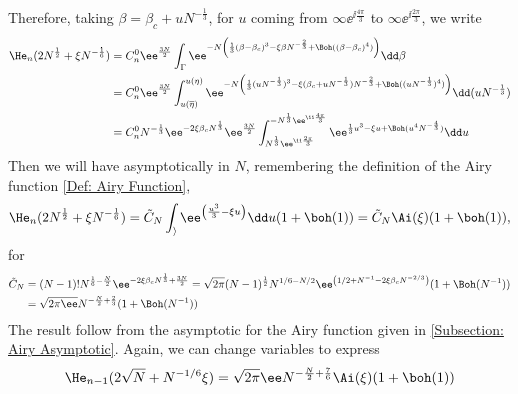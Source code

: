{\begin{figure}
	\label{Figure: Change of local variables, Airy}
\end{figure}
Therefore, taking $\beta = \beta_c + u N^{-\frac{1}{3}}$, for $u$ coming from $\infty \ee^{\ii \frac{4\pi}{3}}$ to $\infty \ee^{\ii \frac{2\pi}{3}}$, we write
\begin{align}
	\He_n(2 N^{\frac{1}{2}} + \xi N^{-\frac{1}{6}}) & = 
	C_n^0 \ee^{\frac{3N}{2}} 
	\int_{\Gamma}  
	\ee^{-N 
		\left(
		\frac{1}{3}(\beta - \beta_c)^3 - \xi \beta N^{-\frac{2}{3}} + \Boh((\beta - \beta_c)^4) 
		\right)}
	\dd \beta 
	\\
	& = C_n^0 \ee^{\frac{3N}{2}} 
	\int_{u(\overline{\eta})}^{u(\eta)}
	\ee^{-N \left(\frac{1}{3}(u N^{-\frac{1}{3}})^3 - \xi (\beta_c + u N^{-\frac{1}{3}}) N^{-\frac{2}{3}} + 
		\Boh((u N^{-\frac{1}{3}})^4) \right)} \dd (u N^{-\frac{1}{3}})
	\\
	& = C_n^0 N^{-\frac{1}{3}} \ee^{-2\xi\beta_c N^{\frac{1}{3}}} \ee^{\frac{3N}{2}}
	\int_{N^{\frac{1}{3}} \ee^{\ii \frac{2\pi}{3}}}^{-N^{\frac{1}{3}} \ee^{\ii \frac{4\pi}{3}}}  \ee^{\frac{1}{3} u^3 - \xi u + \Boh(u^4 N^{-\frac{4}{3}})} \dd u
\end{align}
Then we will have asymptotically in $N$, remembering the definition of the Airy function \ref{Def: Airy Function},
\begin{equation}
	\He_n(2N^{\frac{1}{2}} + \xi N^{-\frac{1}{6}}) = \tilde{C}_N \int_{\rangle}  \ee^{\left(\frac{u^3}{3} - \xi u\right)} \dd u (1 + \boh(1)) = \tilde{C}_N \Ai(\xi) (1 + \boh(1)),
\end{equation}
for
\begin{align}
	\tilde{C}_N & = (N-1)! N^{\frac{1}{6} - \frac{N}{2}} \ee^{-2\xi\beta_c N^{\frac{1}{3}} + \frac{3N}{2}} = \sqrt{2\pi} (N-1)^{\frac{1}{2}} N^{1/6 - N/2} \ee^{\left(1/2 + N^{-1} - 2\xi \beta_c N^{-2/3} \right)} (1 + \Boh(N^{-1})) \\
	& = \sqrt{2\pi\ee} N^{-\frac{N}{2} + \frac{2}{3}} (1 + \Boh(N^{-1})) 
\end{align} 
The result follow from the asymptotic for the Airy function given in \ref{Subsection: Airy Asymptotic}. Again, we can change variables to express
\begin{equation}
	\He_{n-1}(2\sqrt{N} + N^{-1/6}\xi) = \sqrt{2\pi} \ee N^{-\frac{N}{2} + \frac{7}{6}}  \Ai(\xi) (1 + \boh(1))
\end{equation}

}
